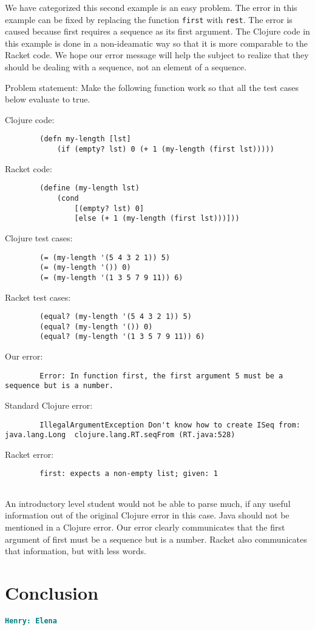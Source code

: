 \documentclass[12pt]{article}
\newcommand{\comment}[1]{{\bf \tt  {#1}}}
\newcommand{\hfcomment}[1]{\textcolor{Teal}{\comment{Henry: {#1}}}}
\begin{document}
	We have categorized this second example is an easy problem.
	The error in this example can be fixed by replacing the function \texttt{first} with \texttt{rest}. 
	The error is caused because first requires a sequence as its first argument. 
	The Clojure code in this example is done in a non-ideamatic way so that it is more comparable to the Racket code.
	We hope our error message will help the subject to realize that they should be dealing with a sequence, not an element of a sequence. 
	
	
	

	Problem statement:
		Make the following function work so that all the test cases below evaluate to true. 
		
		
	Clojure code:
\begin{verbatim}
		(defn my-length [lst]
 			(if (empty? lst) 0 (+ 1 (my-length (first lst)))))
\end{verbatim}
	Racket code:
\begin{verbatim}
		(define (my-length lst)
  			(cond
 				[(empty? lst) 0]
   				[else (+ 1 (my-length (first lst)))]))
\end{verbatim}
	Clojure test cases:
\begin{verbatim}
		(= (my-length '(5 4 3 2 1)) 5)
		(= (my-length '()) 0)
		(= (my-length '(1 3 5 7 9 11)) 6)
\end{verbatim}
	Racket test cases:
\begin{verbatim}
		(equal? (my-length '(5 4 3 2 1)) 5)
		(equal? (my-length '()) 0)
		(equal? (my-length '(1 3 5 7 9 11)) 6)
\end{verbatim}
	Our error:
\begin{verbatim}
		Error: In function first, the first argument 5 must be a sequence but is a number.
\end{verbatim}
	Standard Clojure error:
\begin{verbatim}
		IllegalArgumentException Don't know how to create ISeq from: java.lang.Long  clojure.lang.RT.seqFrom (RT.java:528)

\end{verbatim}
	Racket error:
\begin{verbatim}
		first: expects a non-empty list; given: 1
		
\end{verbatim}
	An introductory level student would not be able to parse much, if any useful information out of the original Clojure error in this case. 
	Java should not be mentioned in a Clojure error. 
	Our error clearly communicates that the first argument of first must be a sequence but is a number.
	Racket also communicates that information, but with less words. 


\section{Conclusion}\label{sec:conclusion}
	\hfcomment{Elena}




\end{document}
